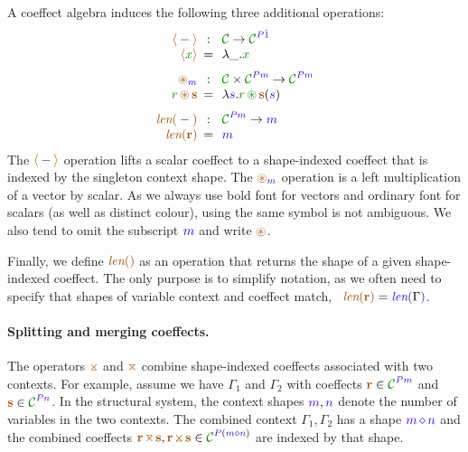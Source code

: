\noindent
A coeffect algebra induces the following three additional operations:
%
\begin{equation*}
\begin{array}{rclcrcl}
 \alift{-} &\narrow{:}& \C \rightarrow \C^{\SP \sunit}  \\
 \alift{\cclrd{x}} &\narrow{=}& \lambda \_ . \cclrd{x}   \\
\\[-0.5em]
 \aseq_{\sclrd{m}} &\narrow{:}&  \C \times \C^{\SP \sclrd{m}} \rightarrow \C^{\SP \sclrd{m}}   \\
 \cclrd{r}\, \aseq\, \aclrd{\textbf{s}} &\narrow{=}& \lambda \sclrd{s} . \cclrd{r}\, \cseq\, \aclrd{\textbf{s}}(\sclrd{s}) \\
\\[-0.5em]
 \alen{-} &\narrow{:}& \C^{\SP \sclrd{m}} \rightarrow \sclrd{m}\\
 \alen{\aclrd{\textbf{r}}} &\narrow{=}& \sclrd{m}
\end{array}
\end{equation*}
%
The $\alift{-}$ operation lifts a scalar coeffect to a shape-indexed coeffect that is indexed by 
the singleton context shape. The $\aseq_{\sclrd{m}}$ operation is a left multiplication of a 
vector by scalar. As we always use bold font for vectors and ordinary font for scalars (as well 
as distinct colour), using the same symbol is not ambiguous. We also tend to omit the subscript
$\sclrd{m}$ and write $\aseq$. 

Finally, we define $\alen{}$ as an operation that returns the shape of a given shape-indexed 
coeffect. The only purpose is to simplify notation, as we often need to specify that shapes of 
variable context and coeffect match, \eg~$\alen{\aclrd{\textbf{r}}} = \slen{\Gamma}$.

\paragraph{Splitting and merging coeffects.}
The operators $\apar$ and $\azip$ combine shape-indexed coeffects associated with two contexts. 
For example, assume we have $\Gamma_1$ and $\Gamma_2$ with coeffects $\aclrd{\textbf{r}} \in 
\C^{\SP\sclrd{m}}$ and $\aclrd{\textbf{s}} \in \C^{\SP\sclrd{n}}$. In the structural system, the 
context shapes $\sclrd{m}, \sclrd{n}$ denote the number of variables in the two contexts. The 
combined context $\Gamma_1, \Gamma_2$ has a shape $\sclrd{m}\,\stimes\,\sclrd{n}$ and the combined 
coeffects $\aclrd{\textbf{r}} \,\azip\, \aclrd{\textbf{s}}, \aclrd{\textbf{r}} \,\apar\, \aclrd{\textbf{s}} 
\in \C^{\SP(\sclrd{m} \stimes \sclrd{n})}$ are indexed by that shape.


